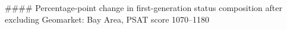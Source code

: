 #### Percentage-point change in first-generation status composition after excluding Geomarket: Bay Area, PSAT score 1070–1180
